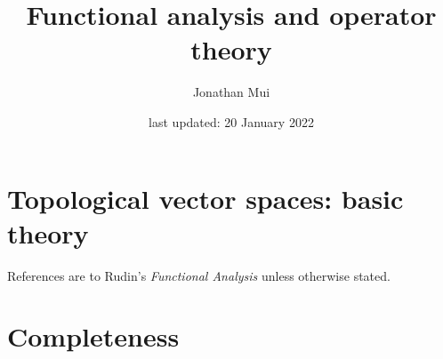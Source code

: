 \documentclass[11pt]{article}
\title{Functional analysis and operator theory}
\author{Jonathan Mui}
\date{last updated: 20 January 2022}
\begin{document}
	
	\maketitle
	
	\tableofcontents
	
	\section{Topological vector spaces: basic theory}
	References are to Rudin's \emph{Functional Analysis} unless otherwise stated.
	
	
	\section{Completeness}
	
	
\end{document}
